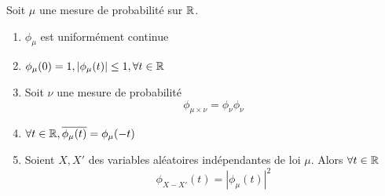 \documentclass[]{report}
\begin{document}
    \begin{prop}{}{}
        Soit $\mu$ une mesure de probabilité sur $\mathbb{R}$.
        \begin{enumerate}
            \item $\phi_\mu$ est uniformément continue
            \item $\phi_\mu(0)=1,|\phi_\mu(t)|\le 1,\forall t\in \mathbb{R}$
            \item Soit $\nu$ une mesure de probabilité
            \[\phi_{\mu\times \nu}=\phi_\nu \phi_\nu\]
            \item $\forall t\in \mathbb{R}, \overline{\phi_\mu(t)}=\phi_\mu(-t)$
            \item Soient $X,X'$ des variables aléatoires indépendantes de loi $\mu$. Alors $\forall t\in\mathbb{R}$
            \[\phi_{X-X'}(t)=|\phi_\mu(t)|^2\]
        \end{enumerate}
    \end{prop}
\end{document}
